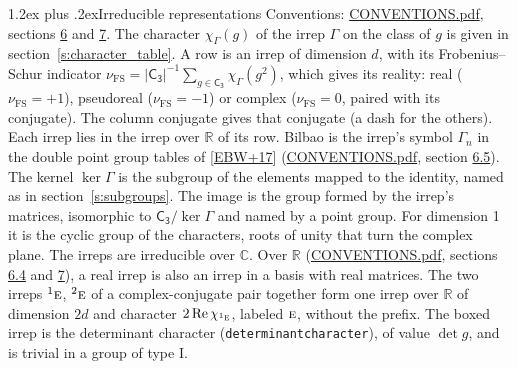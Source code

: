 \documentclass[10pt,a4paper]{article}
\makeatletter
\renewcommand\section{\@startsection{section}{1}{\z@}{-3ex plus -1ex minus -.2ex}%
  {1.2ex plus .2ex}{\normalfont\large\sffamily\bfseries\color{parttitle}}}
\numberwithin{equation}{section}
\newcommand{\grp}[1]{\mathsf{#1}}
\newcommand{\irr}[1]{\text{\normalfont\scshape #1}}
\newcommand{\conjpair}[1]{{}^{#1}}
\newcommand{\irchar}[1]{\chi_{#1}}
\newcommand{\fsind}{\nu_{\mathrm{FS}}}
\makeatother
\begin{document}
\section{Irreducible representations}\label{s:irreps}
Conventions: \href{../../CONVENTIONS.pdf}{CONVENTIONS.pdf}, sections \href{../../CONVENTIONS.pdf\#conv.6}{6} and \href{../../CONVENTIONS.pdf\#conv.7}{7}.
\leavevmode\label{n:function.character}\label{n:irrep.Gamma}The character $\irchar{\Gamma}(g)$ of the irrep $\Gamma$ on the class of $g$ is given in section~\ref{s:character_table}.
\leavevmode\label{n:index.dimension}\label{n:index.frobenius}\label{n:head.irrep}\label{n:head.reality}A row is an irrep of dimension $d$, with its Frobenius--Schur indicator $\fsind = |\grp{C_{3}}|^{-1}\allowbreak\sum_{g\in\grp{C_{3}}}\irchar{\Gamma}(g^2)$, which gives its reality: real ($\fsind = +1$), pseudoreal ($\fsind = -1$) or complex ($\fsind = 0$, paired with its conjugate). \label{n:head.conjugate}The column conjugate gives that conjugate (a dash for the others). \label{n:head.over.real}Each irrep lies in the irrep over $\mathbb{R}$ of its row. \label{n:head.bilbao}\label{n:irrep.alias.gamma}Bilbao is the irrep's symbol $\Gamma_n$ in the double point group tables of [\href{../../../REFERENCES.pdf\#ref.EBW+17}{EBW+17}] (\href{../../CONVENTIONS.pdf}{CONVENTIONS.pdf}, section \href{../../CONVENTIONS.pdf\#conv.6.5}{6.5}). \label{n:head.kernel}The kernel $\ker\Gamma$ is the subgroup of the elements mapped to the identity, named as in section~\ref{s:subgroups}. \label{n:head.image}The image is the group formed by the irrep's matrices, isomorphic to $\grp{C_{3}}/\ker\Gamma$ and named by a point group. For dimension 1 it is the cyclic group of the characters, roots of unity that turn the complex plane. The irreps are irreducible over $\mathbb{C}$. Over $\mathbb{R}$ (\href{../../CONVENTIONS.pdf}{CONVENTIONS.pdf}, sections \href{../../CONVENTIONS.pdf\#conv.6.4}{6.4} and \href{../../CONVENTIONS.pdf\#conv.7}{7}), a real irrep is also an irrep in a basis with real matrices. The two irreps $\conjpair{1}\irr{e}$, $\conjpair{2}\irr{e}$ of a complex-conjugate pair together form one irrep over $\mathbb{R}$ of dimension $2d$ and character $2\operatorname{Re}\irchar{\conjpair{1}\irr{e}}$, labeled $\irr{e}$, without the prefix. \label{n:mark.determinant}The boxed irrep is the determinant character (\texttt{determinantcharacter}), of value $\det g$, and is trivial in a group of type I.
\setlength{\emergencystretch}{2em}\par\setlength{\emergencystretch}{0pt}
\end{document}
